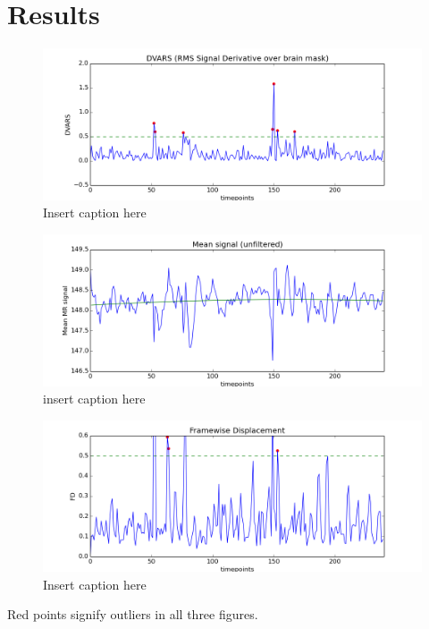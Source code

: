 \section{Results}

\begin{figure}[H]
    \centering
        \includegraphics[scale=0.5]{figures/dvars_sub9run1.png}
    \caption{Insert caption here}
\end{figure}

\begin{figure}[H]
    \centering
        \includegraphics[scale=0.5]{figures/mean_sub9run1.png}
    \caption{insert caption here}
\end{figure}    

\begin{figure}[H]
    \centering
        \includegraphics[scale = 0.5]{figures/fd_sub9run1.png}
    \caption{Insert caption here}
\end{figure}

\centering
    Red points signify outliers in all three figures.

